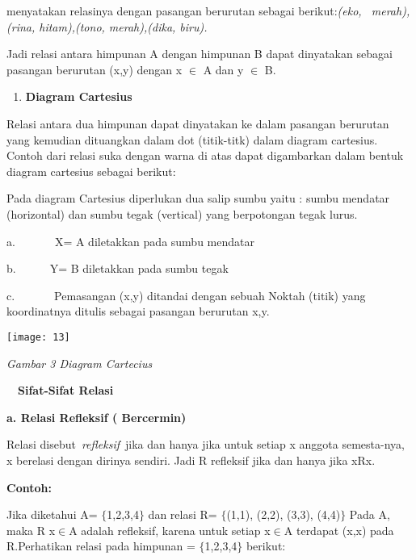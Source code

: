\documentclass[11pt,fleqn]{book} %
\begin{document}
\noindent 

\noindent menyatakan relasinya dengan pasangan berurutan sebagai berikut:\textit{(eko, ~merah), (rina, hitam),(tono, merah),(dika, biru).}

\noindent Jadi relasi antara himpunan A dengan himpunan B dapat dinyatakan sebagai pasangan berurutan (x,y) dengan x $\mathrm{\in }$ A dan y $\mathrm{\in }$ B.

\noindent 

\begin{enumerate}
\item  \textbf{Diagram Cartesius}
\end{enumerate}

\noindent Relasi antara dua himpunan dapat dinyatakan ke dalam pasangan berurutan yang kemudian dituangkan dalam dot (titik-titk) dalam diagram cartesius. Contoh dari relasi suka dengan warna di atas dapat digambarkan dalam bentuk diagram cartesius sebagai berikut:

\noindent Pada diagram Cartesius diperlukan dua salip sumbu yaitu : sumbu mendatar (horizontal) dan sumbu tegak (vertical) yang berpotongan tegak lurus.

\noindent a.~~~~~~~X= A diletakkan pada sumbu mendatar

\noindent b.~~~~~~Y= B diletakkan pada sumbu tegak

\noindent c.~~~~~~~Pemasangan (x,y) ditandai dengan sebuah Noktah (titik) yang koordinatnya ditulis sebagai pasangan berurutan x,y.

\begin{center}
\noindent \texttt{[image: 13]}
\end{center}

\noindent \textit{Gambar 3 Diagram Cartecius}

\noindent 

\noindent 

 ~~\textbf{Sifat-Sifat Relasi}

\textbf{a. Relasi Refleksif ( Bercermin)}

\textbf{}

Relasi disebut~\textit{refleksif}~jika dan hanya jika untuk setiap x anggota semesta-nya, x berelasi dengan dirinya sendiri. Jadi R refleksif jika dan hanya jika xRx.

\textbf{}

\textbf{Contoh:}



\noindent Jika diketahui A= $\{$1,2,3,4$\}$ dan relasi R= $\{$(1,1), (2,2), (3,3), (4,4)$\}$ Pada A, maka R x$\mathrm{\in }$A adalah refleksif, karena untuk setiap x$\mathrm{\in }$A terdapat (x,x) pada R.Perhatikan relasi pada himpunan = $\{$1,2,3,4$\}$ berikut:
\end{document}
